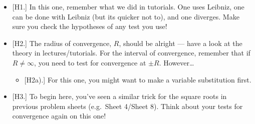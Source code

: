 \documentclass[
  10pt,
  a4paper]{article}
\providecommand{\tightlist}{%
  \setlength{\itemsep}{0pt}\setlength{\parskip}{0pt}}
\theoremstyle{plain}
\theoremstyle{plain}
\theoremstyle{plain}
\theoremstyle{plain}
\theoremstyle{plain}
\theoremstyle{definition}
\theoremstyle{definition}
\theoremstyle{definition}
\theoremstyle{remark}
\begin{document}
\begin{itemize}
\tightlist
\item
  {[}H1.{]} In this one, remember what we did in tutorials. One uses Leibniz, one can be done with Leibniz (but its quicker not to), and one diverges. Make sure you check the hypotheses of any test you use!
\item
  {[}H2.{]} The radius of convergence, \(R\), should be alright --- have a look at the theory in lectures/tutorials. For the interval of convergence, remember that if \(R \neq \infty\), you need to test for convergence at \(\pm R\). However\ldots{}

  \begin{itemize}
  \tightlist
  \item
    {[}H2a).{]} For this one, you might want to make a variable substitution first.
  \end{itemize}
\item
  {[}H3.{]} To begin here, you've seen a similar trick for the square roots in previous problem sheets (e.g.~Sheet 4/Sheet 8). Think about your tests for convergence again on this one!
\end{itemize}
\end{document}
